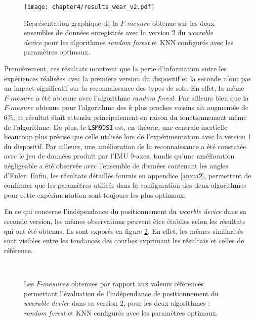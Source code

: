 \begin{figure}[ht!]
	\centering
	\texttt{[image: chapter4/results\_wear\_v2.pdf]}
        \caption{Représentation graphique de la $F\mbox{-} mesure$ obtenue sur les deux ensembles de données enregistrés avec la version 2 du \textit{wearable device} pour les algorithmes \textit{random forest} et \acs{KNN} configurés avec les paramètres optimaux.}
	\label{fig:results_wear_v2}
\end{figure}

Premièrement, ces résultats montrent que la perte d'information entre les expériences réalisées avec la première version du dispositif et la seconde n'ont pas un impact significatif sur la reconnaissance des types de sols. En effet, la même $F\mbox{-}mesure$ a été obtenue avec l'algorithme \textit{random forest}. Par ailleurs bien que la $F\mbox{-}mesure$ obtenue pour l'algorithme des $k$ plus proches voisins ait augmentée de 6\%, ce résultat était attendu principalement en raison du fonctionnement même de l'algorithme. De plus, le \texttt{LSM9DS1} est, en théorie, une centrale inertielle beaucoup plus précise que celle utilisée lors de l'expérimentation avec la version 1 du dispositif. Par ailleurs, une amélioration de la reconnaissance a été constatée avec le jeu de données produit par l'\acs{IMU} 9-axes, tandis qu'une amélioration négligeable a été observée avec l'ensemble de données contenant les angles d'Euler. Enfin, les résultats détaillés fournis en appendice \ref{anx:a2}, permettent de confirmer que les paramètres utilisés dans la configuration des deux algorithmes pour cette expérimentation sont toujours les plus optimaux.

En ce qui concerne l'indépendance du positionnement du \textit{wearble device} dans sa seconde version, les mêmes observations peuvent être établies selon les résultats qui ont été obtenus. Ils sont exposés en figure \ref{fig:pos_ind_wear_v2}. En effet, les mêmes similarités sont visibles entre les tendances des courbes exprimant les résultats et celles de référence.

\begin{figure}[t!]
    \centering
    \\[20pt]
    \caption{Les $F\mbox{-} mesures$ obtenues par rapport aux valeurs références permettant l'évaluation de l'indépendance de positionnement du \textit{wearable device} dans sa version 2, pour les deux algorithmes : \textit{random forest} et \acs{KNN} configurés avec les paramètres optimaux.}
    \label{fig:pos_ind_wear_v2}
\end{figure}

